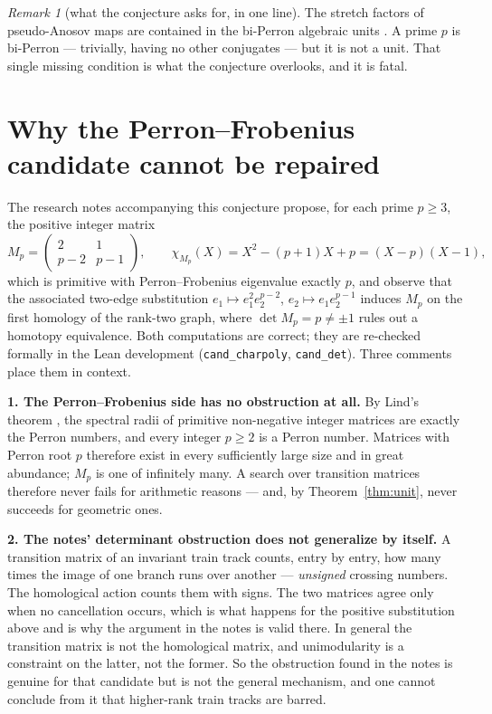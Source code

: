 \documentclass[11pt]{article}
\theoremstyle{plain}
\theoremstyle{definition}
\theoremstyle{remark}
\newtheorem{remark}[theorem]{Remark}
\begin{document}
\begin{remark}[what the conjecture asks for, in one line]
The stretch factors of pseudo-Anosov maps are contained in the bi-Perron algebraic
units \cite{Fried}. A prime $p$ is bi-Perron --- trivially, having no other
conjugates --- but it is not a unit. That single missing condition is what the
conjecture overlooks, and it is fatal.
\end{remark}

\section{Why the Perron--Frobenius candidate cannot be repaired}
\label{sec:candidate}

The research notes accompanying this conjecture propose, for each prime $p\ge3$,
the positive integer matrix
\[
  M_{p}=\begin{pmatrix}2&1\\p-2&p-1\end{pmatrix},
  \qquad
  \chi_{M_{p}}(X)=X^{2}-(p+1)X+p=(X-p)(X-1),
\]
which is primitive with Perron--Frobenius eigenvalue exactly $p$, and observe that
the associated two-edge substitution $e_{1}\mapsto e_{1}^{2}e_{2}^{p-2}$,
$e_{2}\mapsto e_{1}e_{2}^{p-1}$ induces $M_{p}$ on the first homology of the
rank-two graph, where $\det M_{p}=p\ne\pm1$ rules out a homotopy equivalence. Both
computations are correct; they are re-checked formally in the Lean development
(\texttt{cand\_charpoly}, \texttt{cand\_det}). Three comments place them in
context.

\smallskip
\noindent\textbf{1. The Perron--Frobenius side has no obstruction at all.} By
Lind's theorem \cite{Lind}, the spectral radii of primitive non-negative integer
matrices are exactly the Perron numbers, and every integer $p\ge2$ is a Perron
number. Matrices with Perron root $p$ therefore exist in every sufficiently large
size and in great abundance; $M_{p}$ is one of infinitely many. A search over transition matrices therefore never
fails for arithmetic reasons --- and, by Theorem~\ref{thm:unit}, never succeeds
for geometric ones.

\smallskip
\noindent\textbf{2. The notes' determinant obstruction does not generalize by
itself.} A transition matrix of an invariant train track \cite{BH} counts, entry by
entry, how many times the image of one branch runs over another ---
\emph{unsigned} crossing numbers.
The homological action counts them with signs. The two matrices agree only when no
cancellation occurs, which is what happens for the positive substitution above and
is why the argument in the notes is valid there. In general the transition matrix
is not the homological matrix, and unimodularity is a constraint on the latter, not
the former. So the obstruction found in the notes is genuine for that candidate but
is not the general mechanism, and one cannot conclude from it that higher-rank
train tracks are barred.
\end{document}
